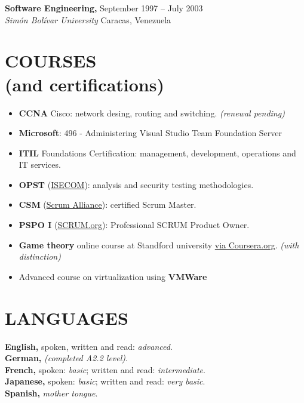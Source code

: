 \documentclass[line,margin]{res}
\begin{document}
\begin{resume}
               \textbf{Software Engineering,} \hfill 
               September 1997 -- July 2003 \\
               \textit{Sim\'{o}n Bol\'{i}var University} \hfill Caracas, Venezuela

\section{COURSES \\ \footnotesize{(and certifications)}}
               \begin{itemize}  \itemsep 2pt %
               \item \textbf{CCNA} Cisco: network desing, routing and 
               switching. \textit{(renewal pending)}
               \item \textbf{Microsoft}: 496 - Administering Visual Studio Team Foundation Server 
               \item \textbf{ITIL} Foundations Certification: management, 
               development, operations and IT services.
               \item \textbf{OPST} (\href{http://www.isecom.org/certification/opst.html}{ISECOM}): analysis and security testing methodologies.
	    \item \textbf{CSM} (\href{https://www.scrumalliance.org/certifications/practitioners/certified-scrummaster-csm}{Scrum Alliance}): certified Scrum Master.
               \item \textbf{PSPO I} (\href{https://www.scrum.org/Assessments/Professional-Scrum-Product-Owner-Assessments}{SCRUM.org}): Professional SCRUM Product Owner.
	    \item \textbf{Game theory} online course at Standford university \href{https://www.coursera.org/course/gametheory}{via Coursera.org}. \textit{(with distinction)}
               \item Advanced course on virtualization using \textbf{VMWare} 
               \end{itemize}


\section{LANGUAGES} 
               \textbf{English,}
               spoken, written and read: \textit{advanced}.
               \\
               \textbf{German,}
               \textit{(completed A2.2 level)}.
               \\
               \textbf{French,}
               spoken: \textit{basic}; written and read: 
               \textit{intermediate}.
               \\
               \textbf{Japanese,}
               spoken: \textit{basic}; written and read: 
               \textit{very basic}.
               \\
               \textbf{Spanish,}
               \textit{mother tongue}.


\end{resume}
\end{document}
